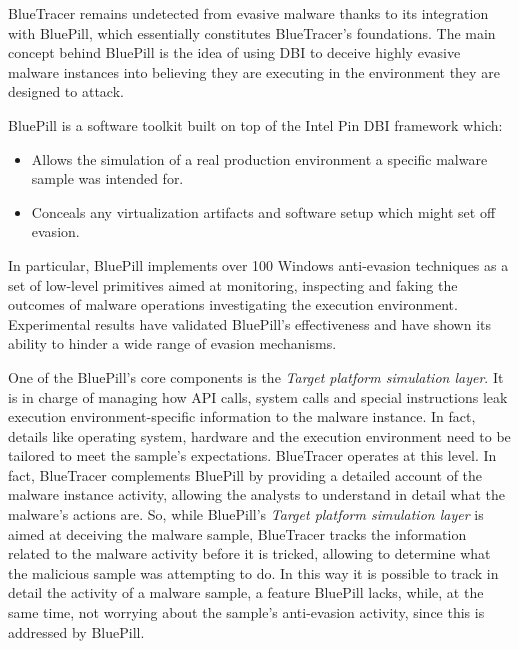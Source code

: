 BlueTracer remains undetected from evasive malware thanks to its integration with BluePill, which essentially constitutes BlueTracer's foundations. The main concept behind BluePill is the idea of using DBI to deceive highly evasive malware instances into believing they are executing in the environment they are designed to attack. 

BluePill \cite{BluePill} is a software toolkit built on top of the Intel Pin DBI framework which:

\begin{itemize}
\item Allows the simulation of a real production environment a specific malware sample was intended for.
\item Conceals any virtualization artifacts and software setup which might set off evasion. 
\end{itemize}

In particular, BluePill implements over 100 Windows anti-evasion techniques as a set of low-level primitives aimed at monitoring, inspecting and faking the outcomes of malware operations investigating the execution environment. Experimental results have validated BluePill's effectiveness and have shown its ability to hinder a wide range of evasion mechanisms.    

One of the BluePill's core components is the \textit{Target platform simulation layer}. It is in charge of managing how API calls, system calls and special instructions leak execution environment-specific information to the malware instance. In fact, details like operating system, hardware and the execution environment need to be tailored to meet the sample's expectations. BlueTracer operates at this level. In fact, BlueTracer complements BluePill by providing a detailed account of the malware instance activity, allowing the analysts to understand in detail what the malware's actions are. So, while BluePill's \textit{Target platform simulation layer} is aimed at deceiving the malware sample, BlueTracer tracks the information related to the malware activity before it is tricked, allowing to determine what the malicious sample was attempting to do. In this way it is possible to track in detail the activity of a malware sample, a feature BluePill lacks, while, at the same time, not worrying about the sample's anti-evasion activity, since this is addressed by BluePill.

